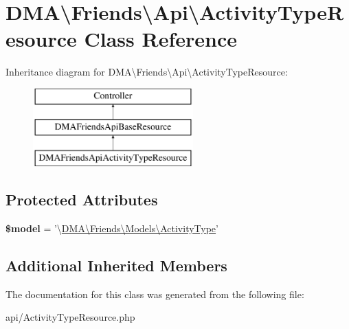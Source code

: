 \hypertarget{classDMA_1_1Friends_1_1Api_1_1ActivityTypeResource}{\section{D\-M\-A\textbackslash{}Friends\textbackslash{}Api\textbackslash{}Activity\-Type\-Resource Class Reference}
\label{classDMA_1_1Friends_1_1Api_1_1ActivityTypeResource}
}
Inheritance diagram for D\-M\-A\textbackslash{}Friends\textbackslash{}Api\textbackslash{}Activity\-Type\-Resource\-:\begin{figure}[H]
\begin{center}
\leavevmode
\includegraphics[height=3.000000cm]{d4/d36/classDMA_1_1Friends_1_1Api_1_1ActivityTypeResource}
\end{center}
\end{figure}
\subsection*{Protected Attributes}
\begin{DoxyCompactItemize}
\item 
\hypertarget{classDMA_1_1Friends_1_1Api_1_1ActivityTypeResource_adbfb8930be9081353d18b93174a97797}{{\bfseries \$model} = '\textbackslash{}\hyperlink{classDMA_1_1Friends_1_1Models_1_1ActivityType}{D\-M\-A\textbackslash{}\-Friends\textbackslash{}\-Models\textbackslash{}\-Activity\-Type}'}\label{classDMA_1_1Friends_1_1Api_1_1ActivityTypeResource_adbfb8930be9081353d18b93174a97797}

\end{DoxyCompactItemize}
\subsection*{Additional Inherited Members}


The documentation for this class was generated from the following file\-:\begin{DoxyCompactItemize}
\item 
api/Activity\-Type\-Resource.\-php\end{DoxyCompactItemize}
